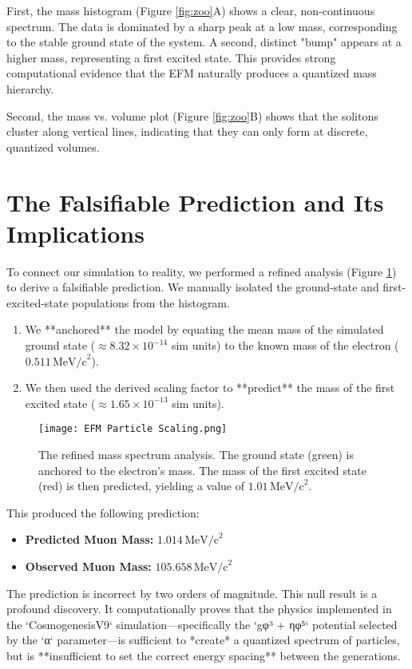 \documentclass[11pt, twoside]{article}
\begin{document}
First, the mass histogram (Figure \ref{fig:zoo}A) shows a clear, non-continuous spectrum. The data is dominated by a sharp peak at a low mass, corresponding to the stable ground state of the system. A second, distinct "bump" appears at a higher mass, representing a first excited state. This provides strong computational evidence that the EFM naturally produces a quantized mass hierarchy.

Second, the mass vs. volume plot (Figure \ref{fig:zoo}B) shows that the solitons cluster along vertical lines, indicating that they can only form at discrete, quantized volumes.

\section{The Falsifiable Prediction and Its Implications}
To connect our simulation to reality, we performed a refined analysis (Figure \ref{fig:prediction}) to derive a falsifiable prediction. We manually isolated the ground-state and first-excited-state populations from the histogram.

\begin{enumerate}
    \item We **anchored** the model by equating the mean mass of the simulated ground state (\(\approx 8.32 \times 10^{-14}\) sim units) to the known mass of the electron (\(0.511 \, \text{MeV/c}^2\)).
    \item We then used the derived scaling factor to **predict** the mass of the first excited state (\(\approx 1.65 \times 10^{-13}\) sim units).
\end{enumerate}

\begin{figure}[htbp!]
\centering
\texttt{[image: EFM Particle Scaling.png]}
\caption{The refined mass spectrum analysis. The ground state (green) is anchored to the electron's mass. The mass of the first excited state (red) is then predicted, yielding a value of \(1.01 \, \text{MeV/c}^2\).}
\label{fig:prediction}
\end{figure}

This produced the following prediction:
\begin{itemize}
    \item \textbf{Predicted Muon Mass:} \(1.014 \, \text{MeV/c}^2\)
    \item \textbf{Observed Muon Mass:} \(105.658 \, \text{MeV/c}^2\)
\end{itemize}
The prediction is incorrect by two orders of magnitude. This null result is a profound discovery. It computationally proves that the physics implemented in the `CosmogenesisV9` simulation—specifically the `gφ³ + ηφ⁵` potential selected by the `α` parameter—is sufficient to *create* a quantized spectrum of particles, but is **insufficient to set the correct energy spacing** between the generations.
\end{document}
